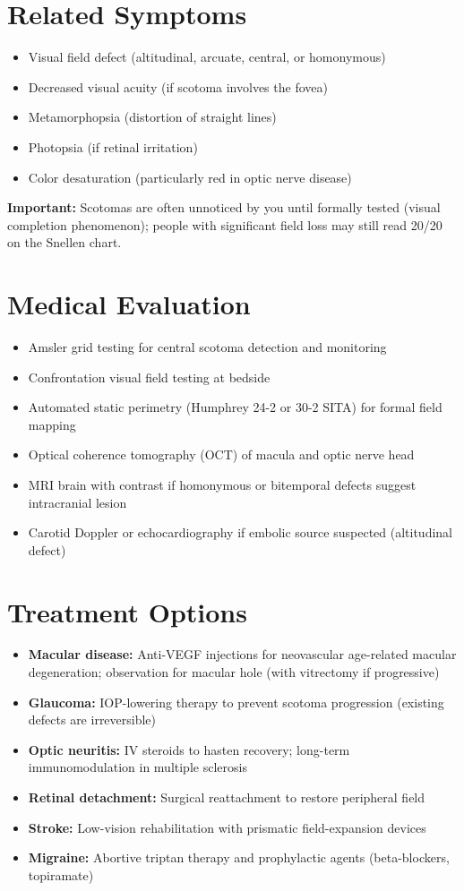 \section*{Related Symptoms}
\begin{itemize}
  \item Visual field defect (altitudinal, arcuate, central, or homonymous)
  \item Decreased visual acuity (if scotoma involves the fovea)
  \item Metamorphopsia (distortion of straight lines)
  \item Photopsia (if retinal irritation)
  \item Color desaturation (particularly red in optic nerve disease)
\end{itemize}
\textbf{Important:} Scotomas are often unnoticed by you until formally tested (visual completion phenomenon); people with significant field loss may still read 20/20 on the Snellen chart.

\section*{Medical Evaluation}
\begin{itemize}
  \item Amsler grid testing for central scotoma detection and monitoring
  \item Confrontation visual field testing at bedside
  \item Automated static perimetry (Humphrey 24-2 or 30-2 SITA) for formal field mapping
  \item Optical coherence tomography (OCT) of macula and optic nerve head
  \item MRI brain with contrast if homonymous or bitemporal defects suggest intracranial lesion
  \item Carotid Doppler or echocardiography if embolic source suspected (altitudinal defect)
\end{itemize}

\section*{Treatment Options}
\begin{itemize}
  \item \textbf{Macular disease:} Anti-VEGF injections for neovascular age-related macular degeneration; observation for macular hole (with vitrectomy if progressive)
  \item \textbf{Glaucoma:} IOP-lowering therapy to prevent scotoma progression (existing defects are irreversible)
  \item \textbf{Optic neuritis:} IV steroids to hasten recovery; long-term immunomodulation in multiple sclerosis
  \item \textbf{Retinal detachment:} Surgical reattachment to restore peripheral field
  \item \textbf{Stroke:} Low-vision rehabilitation with prismatic field-expansion devices
  \item \textbf{Migraine:} Abortive triptan therapy and prophylactic agents (beta-blockers, topiramate)
\end{itemize}

